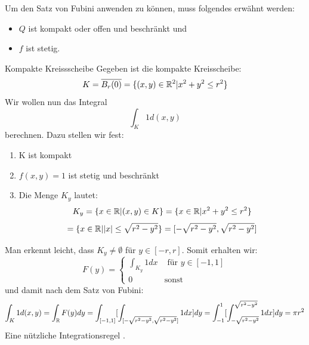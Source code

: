 Um den Satz von Fubini anwenden zu können, muss folgendes erwähnt werden:
\begin{itemize}
    \item $Q$ ist kompakt oder offen und beschränkt und
    \item $f$ ist stetig.
\end{itemize}
\begin{Beispiel}{Kompakte Kreissscheibe}
    Gegeben ist die kompakte Kreisscheibe:
    $$K=\overline{B_r(0)}=\{(x,y)\in\mathbb{R}^2| x^2+y^2\leq r^2\}$$
    Wir wollen nun das Integral
    $$\int_K 1 d(x,y)$$
    berechnen. Dazu stellen wir fest:
    \begin{enumerate}
        \item K ist kompakt
        \item $f(x,y)= 1$ ist stetig und beschränkt
        \item Die Menge $K_y$ lautet:
        $$K_y=\{x\in \mathbb{R}| (x,y)\in K\}=\{ x\in \mathbb{R} | x^2+y^2 \leq r^2\}$$
        $$= \{x\in \mathbb{R} | |x| \leq \sqrt{r^2-y^2}\}=[-\sqrt{r^2-y^2}, \sqrt{r^2-y^2}]$$
    \end{enumerate}
    Man erkennt leicht, dass $K_y\neq \emptyset$ für $y\in [-r, r]$. Somit erhalten wir:
    \begin{equation}
        F(y)=\begin{cases}\int_{K_y} 1dx & \mbox{ für $y\in [-1, 1]$} \\0 & \mbox{sonst}\end{cases}
    \end{equation}
    und damit nach dem Satz von Fubini:
    $$\int_K 1 d(x,y) = \int_{\mathbb{R}} F(y) dy = \int_{[-1,1]}[\int_{[-\sqrt{r^2-y^2}, \sqrt{r^2-y^2}]} 1dx]dy= \int_{-1}^{1} [\int_{-\sqrt{r^2-y^2}}^{\sqrt{r^2-y^2}} 1dx]dy=\pi r^2$$
    Eine nützliche Integrationsregel .
\end{Beispiel}
